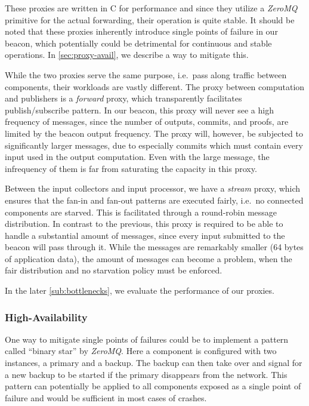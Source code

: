 These proxies are written in C for performance and since they utilize a \textit{ZeroMQ} primitive for the actual forwarding, their operation is quite stable.
It should be noted that these proxies inherently introduce single points of failure in our beacon, which potentially could be detrimental for continuous and stable operations.
In \vref{sec:proxy-avail}, we describe a way to mitigate this.

While the two proxies serve the same purpose, i.e.\ pass along traffic between components, their workloads are vastly different.
The proxy between computation and publishers is a \textit{forward} proxy, which transparently facilitates publish/subscribe pattern.
In our beacon, this proxy will never see a high frequency of messages, since the number of outputs, commits, and proofs, are limited by the beacon output frequency.
The proxy will, however, be subjected to significantly larger messages, due to especially commits which must contain every input used in the output computation.
Even with the large message, the infrequency of them is far from saturating the capacity in this proxy.

Between the input collectors and input processor, we have a \textit{stream} proxy, which ensures that the fan-in and fan-out patterns are executed fairly, i.e.\ no connected components are starved.
This is facilitated through a round-robin message distribution.
In contrast to the previous, this proxy is required to be able to handle a substantial amount of messages, since every input submitted to the beacon will pass through it.
While the messages are remarkably smaller (64 bytes of application data), the amount of messages can become a problem, when the fair distribution and no starvation policy must be enforced.

In the later \vref{sub:bottlenecks}, we evaluate the performance of our proxies.

\subsubsection{High-Availability}\label{sec:proxy-avail}
One way to mitigate single points of failures could be to implement a pattern called \enquote{binary star} by \textit{ZeroMQ}.
Here a component is configured with two instances, a primary and a backup.
The backup can then take over and signal for a new backup to be started if the primary disappears from the network.
This pattern can potentially be applied to all components exposed as a single point of failure and would be sufficient in most cases of crashes.

